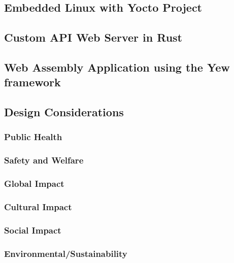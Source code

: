 \documentclass[12pt]{article}
\begin{document}
\subsection{Embedded Linux with Yocto Project}

\subsection{Custom API Web Server in Rust}

\subsection{Web Assembly Application using the Yew framework}


\subsection{Design Considerations}

\subsubsection{Public Health}

\subsubsection{Safety and Welfare}

\subsubsection{Global Impact}

\subsubsection{Cultural Impact}

\subsubsection{Social Impact}

\subsubsection{Environmental/Sustainability}
\end{document}
